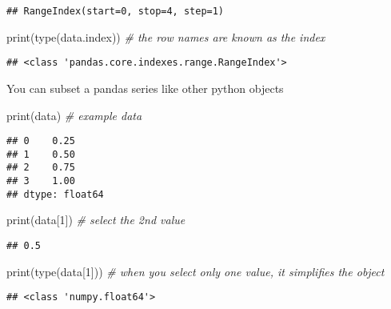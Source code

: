 \documentclass[
]{book}
\newenvironment{Shaded}{\begin{snugshade}}{\end{snugshade}}
\newcommand{\BuiltInTok}[1]{#1}
\newcommand{\CommentTok}[1]{\textcolor[rgb]{0.56,0.35,0.01}{\textit{#1}}}
\newcommand{\DecValTok}[1]{\textcolor[rgb]{0.00,0.00,0.81}{#1}}
\newcommand{\NormalTok}[1]{#1}
\begin{document}
\begin{verbatim}
## RangeIndex(start=0, stop=4, step=1)
\end{verbatim}

\begin{Shaded}
\begin{Highlighting}[]
\BuiltInTok{print}\NormalTok{(}\BuiltInTok{type}\NormalTok{(data.index)) }\CommentTok{\# the row names are known as the index}
\end{Highlighting}
\end{Shaded}

\begin{verbatim}
## <class 'pandas.core.indexes.range.RangeIndex'>
\end{verbatim}

You can subset a pandas series like other python objects

\begin{Shaded}
\begin{Highlighting}[]
\BuiltInTok{print}\NormalTok{(data) }\CommentTok{\# example data}
\end{Highlighting}
\end{Shaded}

\begin{verbatim}
## 0    0.25
## 1    0.50
## 2    0.75
## 3    1.00
## dtype: float64
\end{verbatim}

\begin{Shaded}
\begin{Highlighting}[]
\BuiltInTok{print}\NormalTok{(data[}\DecValTok{1}\NormalTok{]) }\CommentTok{\# select the 2nd value}
\end{Highlighting}
\end{Shaded}

\begin{verbatim}
## 0.5
\end{verbatim}

\begin{Shaded}
\begin{Highlighting}[]
\BuiltInTok{print}\NormalTok{(}\BuiltInTok{type}\NormalTok{(data[}\DecValTok{1}\NormalTok{])) }\CommentTok{\# when you select only one value, it simplifies the object}
\end{Highlighting}
\end{Shaded}

\begin{verbatim}
## <class 'numpy.float64'>
\end{verbatim}
\end{document}
